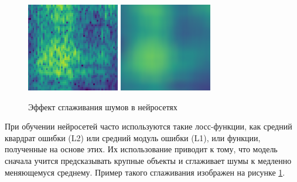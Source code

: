 \begin{figure}
  \includegraphics[width=0.9\linewidth]{figures/noise_reconstruction}
  \includegraphics[width=0.9\linewidth]{figures/noise_reconstruction_smooth}
  \caption{Эффект сглаживания шумов в нейросетях}
  \label{fig:noise_reconstruction}
\end{figure}

При обучении нейросетей часто используются такие лосс-функции, как средний квардрат ошибки (L2) или средний модуль ошибки (L1), 
или функции, полученные на основе этих. 
Их использование приводит к тому, что модель сначала учится предсказывать крупные объекты и сглаживает шумы к медленно меняющемуся среднему.
Пример такого сглаживания изображен на рисунке \ref{fig:noise_reconstruction}.

